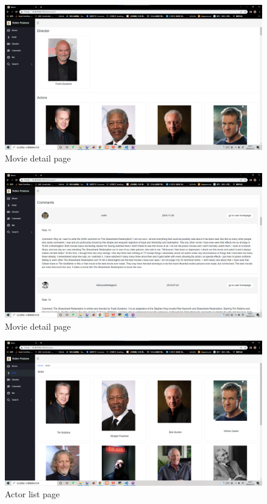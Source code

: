 \begin{CJK*}{UTF8}{gbsn}
\begin{figure}[htbp]
\centering
\includegraphics[width=1\textwidth]{res_movie3.png}
\caption{Movie detail page}
\end{figure}


\begin{figure}[htbp]
\centering
\includegraphics[width=1\textwidth]{res_movie4.png}
\caption{Movie detail page}
\end{figure}


\begin{figure}[htbp]
\centering
\includegraphics[width=1\textwidth]{res_actor1.png}
\caption{Actor list page}
\end{figure}



\end{CJK*}
